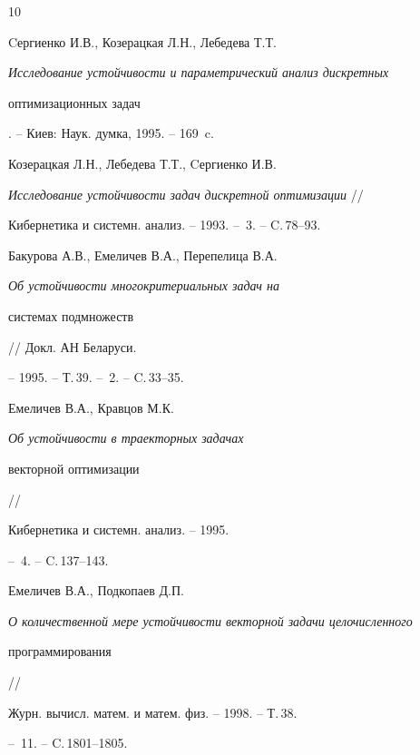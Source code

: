 \begin{thebibliography}{10}







Cергиенко И.В., Козерацкая Л.Н., Лебедева Т.Т.


{\em Исследование устойчивости и параметрический анализ дискретных


оптимизационных задач}. -- Киев: Наук. думка, 1995. -- 169~c.







Козерацкая Л.Н., Лебедева Т.Т., Cергиенко И.В.


{\em Исследование устойчивости задач дискретной оптимизации} //


Кибернетика и системн. анализ. -- 1993. -- \No\,3. -- C.\,78--93.







Бакурова А.В., Емеличев В.А., Перепелица В.А.


{\em Об устойчивости многокритериальных задач на


системах подмножеств} // Докл. АН Беларуси.


-- 1995. -- Т.\,39. -- \No\,2. -- C.\,33--35.







Емеличев В.А., Кравцов М.К. {\em Об устойчивости в траекторных задачах


векторной оптимизации} //


Кибернетика и системн. анализ. -- 1995.


-- \No\,4. -- C.\,137--143.







Емеличев В.А., Подкопаев Д.П.


{\em О количественной мере устойчивости векторной задачи целочисленного


программирования} //


Журн. вычисл. матем. и матем. физ. -- 1998. -- Т.\,38.


-- \No\,11. -- C.\,1801--1805.






\end{thebibliography}
